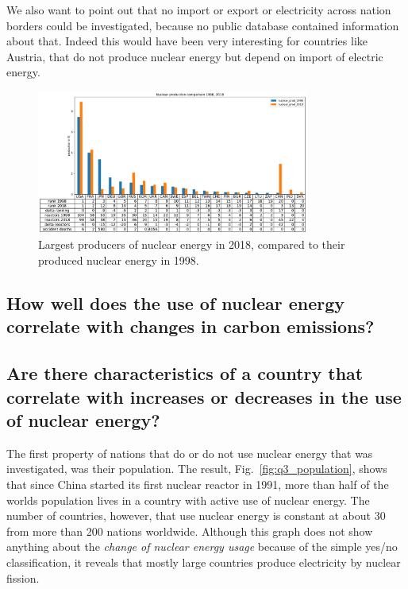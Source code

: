 \documentclass[a4paper,10pt,twocolumn]{scrartcl}
\begin{document}
We also want to point out that no import or export or electricity across nation borders could be investigated, because no public database contained information about that. Indeed this would have been very interesting for countries like Austria, that do not produce nuclear energy but depend on import of electric energy.

\begin{figure}[t]
	\centering
	\includegraphics[width=0.8\textwidth]{../figures/q1_plot2.pdf}
	\caption{Largest producers of nuclear energy in 2018, compared to their produced nuclear energy in 1998.}
	\label{fig:q2_plot2}
\end{figure}

\subsection{How well does the use of nuclear energy correlate with changes in carbon emissions?}



\subsection{Are there characteristics of a country that correlate with increases or decreases in the use of nuclear energy?}

The first property of nations that do or do not use nuclear energy that was investigated, was their population. The result, Fig.~\ref{fig:q3_population}, shows that since China started its first nuclear reactor in 1991, more than half of the worlds population lives in a country with active use of nuclear energy. The number of countries, however, that use nuclear energy is constant at about 30 from more than 200 nations worldwide. Although this graph does not show anything about the \emph{change of nuclear energy usage} because of the simple yes/no classification, it reveals that mostly large countries produce electricity by nuclear fission.
\end{document}
